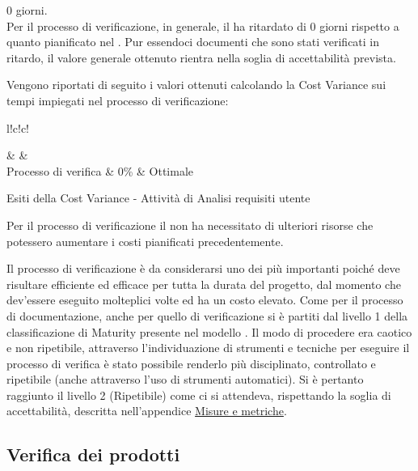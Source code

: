 \documentclass[a4paper, titlepage]{article}
\begin{document}
\begin{description}
\item{} 0 giorni.
\\Per il processo di verificazione, in generale, il  ha ritardato di 0 giorni rispetto a quanto pianificato nel . Pur essendoci documenti che sono stati verificati in ritardo, il valore generale ottenuto rientra nella soglia di accettabilità prevista.
\end{description}

Vengono riportati di seguito i valori ottenuti calcolando la Cost Variance sui tempi impiegati nel processo di verificazione:
\begin{tabella}{l!{\VRule}c!{\VRule}c!{\VRule}}
	
	\color{white}  & \color{white}  &\color{white}  \\
	\endfirsthead
	Processo di verifica & 0\% & Ottimale\\
	\caption{Esiti della Cost Variance - Attività di Analisi requisiti utente}	  
\end{tabella}

 Per il processo di verificazione il  non ha necessitato di ulteriori risorse che potessero aumentare i costi pianificati precedentemente.

Il processo di verificazione è da considerarsi uno dei più importanti poiché deve risultare efficiente ed efficace per tutta la durata del progetto, dal momento che dev'essere eseguito molteplici volte ed ha un costo elevato.
\newline Come per il processo di documentazione, anche per quello di verificazione si è partiti dal livello 1 della classificazione di Maturity presente nel modello . Il modo di procedere era caotico e non ripetibile, attraverso l'individuazione di strumenti e tecniche per eseguire il processo di verifica è stato possibile renderlo più disciplinato, controllato e ripetibile (anche attraverso l'uso di strumenti automatici).
\newline Si è pertanto raggiunto il livello 2 (Ripetibile) come ci si attendeva, rispettando la soglia di accettabilità, descritta nell'appendice \hyperref[sec:metr]{Misure e metriche}.

\subsection{Verifica dei prodotti}
\end{document}
